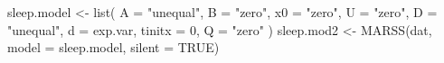 \begin{Schunk}
\begin{Sinput}
 sleep.model <- list(
   A = "unequal", B = "zero", x0 = "zero", U = "zero",
   D = "unequal", d = exp.var, tinitx = 0, Q = "zero"
 )
 sleep.mod2 <- MARSS(dat, model = sleep.model, silent = TRUE)
\end{Sinput}
\end{Schunk}
